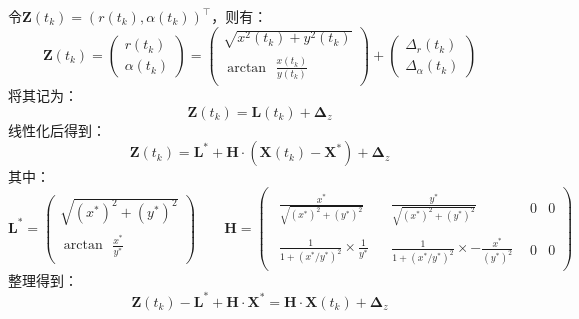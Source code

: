\documentclass[12pt, onecolumn]{article}
\begin{document}
	令$\boldsymbol{Z}(t_k)=\left( r(t_k),\alpha(t_k)\right) ^\top$，则有：
	\begin{equation}
	\boldsymbol{Z}(t_k)=\begin{pmatrix}
	r(t_k)\\\alpha(t_k)
	\end{pmatrix}=\begin{pmatrix}
	\sqrt{x^2(t_k)+y^2(t_k)}\\
	\arctan\begin{aligned}
	\frac{x(t_k)}{y(t_k)}
	\end{aligned}
	\end{pmatrix}+
	\begin{pmatrix}
	\Delta_r(t_k)\\\Delta_\alpha(t_k)
	\end{pmatrix}
	\end{equation}
	将其记为：
	\begin{equation}
	\boldsymbol{Z}(t_k)=\boldsymbol{L}(t_k)+\boldsymbol{\Delta}_z
	\end{equation}
	线性化后得到：
	\begin{equation}
	\boldsymbol{Z}(t_k)=\boldsymbol{L^*}+\boldsymbol{H}\cdot\left(
	\boldsymbol{X}(t_k)-\boldsymbol{X^*}
	\right) +\boldsymbol{\Delta}_z
	\end{equation}
	其中：
	\begin{equation}
	\boldsymbol{L^*}=\begin{pmatrix}
		\sqrt{(x^*)^2+(y^*)^2}\\
		\arctan\begin{aligned}
		\frac{x^*}{y^*}
		\end{aligned}
		\end{pmatrix}
		\qquad
		\boldsymbol{H}=\begin{pmatrix}
			\begin{aligned}
			\frac{x^*}{\sqrt{(x^*)^2+(y^*)^2}}
			\end{aligned}
		&
			\begin{aligned}
			\frac{y^*}{\sqrt{(x^*)^2+(y^*)^2}}
			\end{aligned}
		&0&0\\
		\begin{aligned}
		\frac{1}{1+(x^*/y^*)^2}\times\frac{1}{y^*}
		\end{aligned}
		&
		\begin{aligned}
		\frac{1}{1+(x^*/y^*)^2}\times-\frac{x^*}{(y^*)^2}
		\end{aligned}
		&0&0
		\end{pmatrix}
	\end{equation}
	整理得到：
	\begin{equation}
	\boldsymbol{Z}(t_k)-\boldsymbol{L^*}+\boldsymbol{H}\cdot\boldsymbol{X^*}
	=\boldsymbol{H}\cdot\boldsymbol{X}(t_k)	+\boldsymbol{\Delta}_z
	\end{equation}
	
\end{document}
